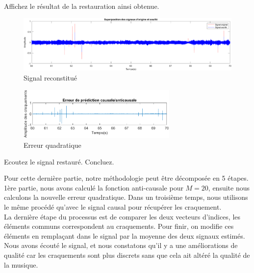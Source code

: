 \documentclass{article}
\begin{document}
Affichez le résultat de la restauration ainsi obtenue.

\begin{figure}[!h]
    \centering
    \includegraphics[width=1\textwidth]{images/partie6_signal.png}
    \caption{Signal reconstitué}
    \label{fig-binaire}
\end{figure}
\newpage
\begin{figure}[!h]
    \centering
    \includegraphics[width=0.7\textwidth]{images/figure2.6.2.png}
    \caption{Erreur quadratique}
    \label{fig-binaire}
\end{figure}

Ecoutez le signal restauré. Concluez.

Pour cette dernière partie, notre méthodologie peut être décomposée en 5 étapes. 1ère partie, nous avons calculé la fonction anti-causale pour $M=20$, ensuite nous calculons la nouvelle erreur quadratique. Dans un troisième temps, nous utilisons le même procédé qu'avec le signal causal pour récupérer les craquement.\\ 
La dernière étape du processus est de comparer les deux vecteurs d'indices, les éléments communs correspondent au craquements. 
Pour finir, on modifie ces éléments en remplaçant dans le signal par la moyenne des deux signaux estimés.\\

Nous avons écouté le signal, et nous constatons qu'il y a une améliorations de qualité car les craquements sont plus discrets sans que cela ait altéré la qualité de la musique.
\end{document}
